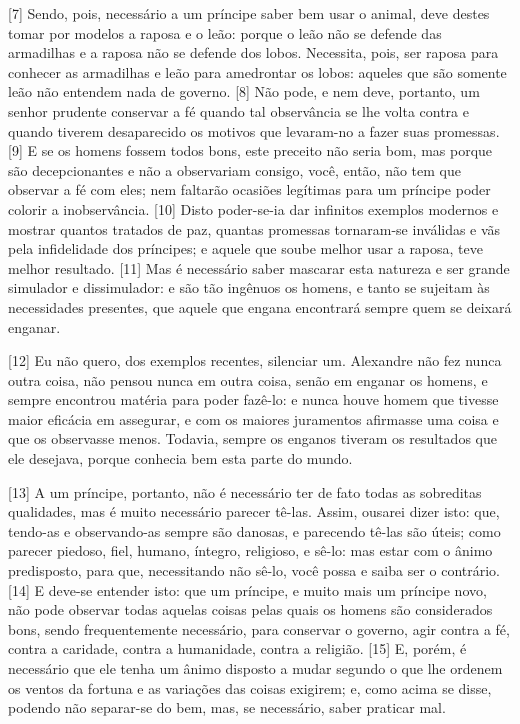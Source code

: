 {[}7{]} Sendo, pois, necessário a um príncipe saber bem usar o animal,
deve destes tomar por modelos a raposa e o leão: porque o leão não se
defende das armadilhas e a raposa não se defende dos lobos. Necessita,
pois, ser raposa para conhecer as armadilhas e leão para amedrontar os
lobos: aqueles que são somente leão não entendem nada de governo.
{[}8{]} Não pode, e nem deve, portanto, um senhor prudente conservar a
fé quando tal observância se lhe volta contra e quando tiverem
desaparecido os motivos que levaram-no a fazer suas promessas. {[}9{]} E
se os homens fossem todos bons, este preceito não seria bom, mas porque
são decepcionantes e não a observariam consigo, você, então, não tem que
observar a fé com eles; nem faltarão ocasiões legítimas para um príncipe
poder colorir a inobservância. {[}10{]} Disto poder-se-ia dar infinitos
exemplos modernos e mostrar quantos tratados de paz, quantas promessas
tornaram-se inválidas e vãs pela infidelidade dos príncipes; e aquele
que soube melhor usar a raposa, teve melhor resultado. {[}11{]} Mas é
necessário saber mascarar esta natureza e ser grande simulador e
dissimulador: e são tão ingênuos os homens, e tanto se sujeitam às
necessidades presentes, que aquele que engana encontrará sempre quem se
deixará enganar.

{[}12{]} Eu não quero, dos exemplos recentes, silenciar um. Alexandre 
não fez nunca outra coisa, não pensou nunca em outra coisa, senão em
enganar os homens, e sempre encontrou matéria para poder fazê-lo: e
nunca houve homem que tivesse maior eficácia em assegurar, e com os
maiores juramentos afirmasse uma coisa e que os observasse menos.
Todavia, sempre os enganos tiveram os resultados que ele desejava,
porque conhecia bem esta parte do mundo.

{[}13{]} A um príncipe, portanto, não é necessário ter de fato todas as
sobreditas qualidades, mas é muito necessário parecer tê-las. Assim,
ousarei dizer isto: que, tendo-as e observando-as sempre são danosas, e
parecendo tê-las são úteis; como parecer piedoso, fiel, humano, íntegro,
religioso, e sê-lo: mas estar com o ânimo predisposto, para que,
necessitando não sê-lo, você possa e saiba ser o contrário. {[}14{]} E
deve-se entender isto: que um príncipe, e muito mais um príncipe novo,
não pode observar todas aquelas coisas pelas quais os homens são
considerados bons, sendo frequentemente necessário, para conservar o
governo, agir contra a fé, contra a caridade, contra a humanidade,
contra a religião. {[}15{]} E, porém, é necessário que ele tenha um
ânimo disposto a mudar segundo o que lhe ordenem os ventos da fortuna e
as variações das coisas exigirem; e, como acima se disse, podendo não
separar-se do bem, mas, se necessário, saber praticar mal.

